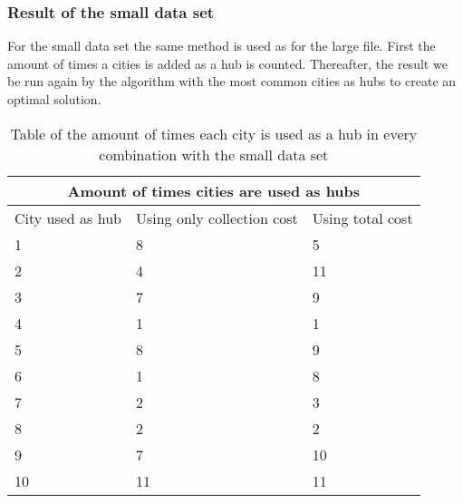 \documentclass{article}
\begin{document}
        \subsubsection{Result of the small data set}
            For the small data set the same method is used as for the large file. First the amount of times a cities is added as a hub is counted. Thereafter, the result we be run again by the algorithm with the most common cities as hubs to create an optimal solution.
            
             \begin{table}[h!]
                \begin{center}
                \begin{tabular}{|p{3cm}|p{3cm}|p{3cm}|}
                    \hline
                    \multicolumn{3}{|c|}{Amount of times cities are used as hubs} \\
                    \hline
                    City used as hub & Using only collection cost & Using total cost\\
                    \hline
                    1 &  8 & 5 \\
                    \hline
                    2 & 4   & 11 \\
                    \hline
                    3& 7 & 9\\
                    \hline
                    4  & 1 & 1 \\
                    \hline
                    5 & 8 & 9\\
                    \hline
                    6 & 1 & 8   \\
                    \hline
                    7 & 2& 3 \\
                    \hline
                    8 & 2 & 2 \\
                    \hline
                    9 &  7& 10 \\
                    \hline
                    10 & 11 & 11 \\
                    \hline
                \end{tabular}
                \end{center}
                \caption{Table of the amount of times each city is used as a hub in every combination with the small data set}
                \label{amount of times hubs are used in collection} 
            \end{table}
            
\end{document}
